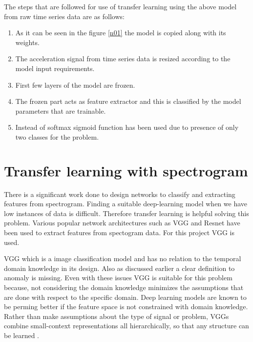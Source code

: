   
     
   The steps that are followed for use of transfer learning using the above model from raw time series data are as follows:
   \begin{enumerate} 
   	\item As it can be seen in the figure \ref{n01} the model is copied along with its weights.
   	\item The acceleration signal from time series data is resized according to the model input requirements. 
   	\item First few layers of the model are frozen.
   	\item The frozen part acts as feature extractor and this is classified by the model parameters that  are trainable.
   	\item Instead of softmax sigmoid function has been used due to presence of only two classes for the problem.
     \end{enumerate}  
   
 
   \section{Transfer learning with spectrogram}   
  There is a significant work done to design networks to classify and extracting features from spectrogram. Finding a suitable deep-learning model when we have low instances of data is difficult. Therefore transfer learning is helpful solving this problem. Various popular network architectures such as VGG and Resnet have been used to extract features from spectogram data. For this project VGG is used. 
  
  VGG which is a image classification model and has no relation to the temporal domain knowledge in its design. Also as discussed earlier a clear definition to anomaly is missing. Even with these issues VGG is suitable for this problem because, not considering the domain knowledge minimizes the assumptions that are done with respect to the specific domain. Deep learning models are known to be perming better if the feature space is not constrained with domain knowledge. Rather than make assumptions about the type of signal or problem, VGGs combine small-context representations all hierarchically, so that any structure can be learned \cite{vgg}. 
  
